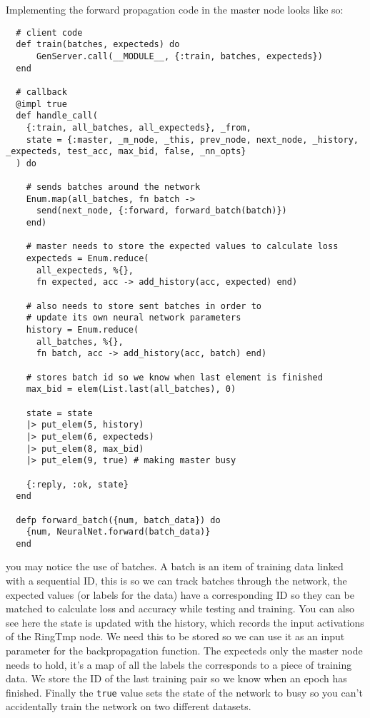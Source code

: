 Implementing the forward propagation code in the master node looks like so:
\begin{lstlisting}
  # client code
  def train(batches, expecteds) do
      GenServer.call(__MODULE__, {:train, batches, expecteds})
  end

  # callback
  @impl true
  def handle_call(
    {:train, all_batches, all_expecteds}, _from,
    state = {:master, _m_node, _this, prev_node, next_node, _history, _expecteds, test_acc, max_bid, false, _nn_opts}
  ) do

    # sends batches around the network
    Enum.map(all_batches, fn batch ->
      send(next_node, {:forward, forward_batch(batch)})
    end)

    # master needs to store the expected values to calculate loss
    expecteds = Enum.reduce(
      all_expecteds, %{},
      fn expected, acc -> add_history(acc, expected) end)

    # also needs to store sent batches in order to
    # update its own neural network parameters
    history = Enum.reduce(
      all_batches, %{},
      fn batch, acc -> add_history(acc, batch) end)

    # stores batch id so we know when last element is finished
    max_bid = elem(List.last(all_batches), 0)

    state = state
    |> put_elem(5, history)
    |> put_elem(6, expecteds)
    |> put_elem(8, max_bid)
    |> put_elem(9, true) # making master busy

    {:reply, :ok, state}
  end

  defp forward_batch({num, batch_data}) do
    {num, NeuralNet.forward(batch_data)}
  end
\end{lstlisting}
you may notice the use of batches. A batch is an item of training data linked
with a sequential ID, this is so we can track batches through the network, the
expected values (or labels for the data) have a corresponding ID so they can be
matched to calculate loss and accuracy while testing and training. You can also
see here the state is updated with the history, which records the input
activations of the RingTmp node. We need this to be stored so we can use it as
an input parameter for the backpropagation function. The expecteds only the
master node needs to hold, it's a map of all the labels the corresponds to a
piece of training data. We store the ID of the last training pair so we know
when an epoch has finished. Finally the \lstinline{true} value sets the state of
the network to busy so you can't accidentally train the network on two different
datasets.

